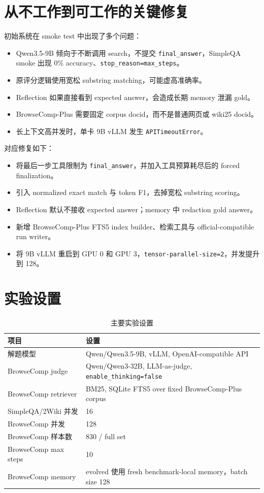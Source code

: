 \documentclass[UTF8,a4paper,11pt]{ctexart}
\begin{document}
\section{从不工作到可工作的关键修复}

初始系统在 smoke test 中出现了多个问题：

\begin{itemize}
  \item Qwen3.5-9B 倾向于不断调用 search，不提交 \texttt{final\_answer}，SimpleQA smoke 出现 0\% accuracy、\texttt{stop\_reason=max\_steps}。
  \item 原评分逻辑使用宽松 substring matching，可能虚高准确率。
  \item Reflection 如果直接看到 expected answer，会造成长期 memory 泄漏 gold。
  \item BrowseComp-Plus 需要固定 corpus docid，而不是普通网页或 wiki25 docid。
  \item 长上下文高并发时，单卡 9B vLLM 发生 \texttt{APITimeoutError}。
\end{itemize}

对应修复如下：

\begin{itemize}
  \item 将最后一步工具限制为 \texttt{final\_answer}，并加入工具预算耗尽后的 forced finalization。
  \item 引入 normalized exact match 与 token F1，去掉宽松 substring scoring。
  \item Reflection 默认不接收 expected answer；memory 中 redaction gold answer。
  \item 新增 BrowseComp-Plus FTS5 index builder、检索工具与 official-compatible run writer。
  \item 将 9B vLLM 重启到 GPU 0 和 GPU 3，\texttt{tensor-parallel-size=2}，并发提升到 128。
\end{itemize}

\section{实验设置}

\begin{table}[h]
\centering
\begin{tabular}{ll}
\toprule
项目 & 设置 \\
\midrule
解题模型 & Qwen/Qwen3.5-9B, vLLM, OpenAI-compatible API \\
BrowseComp judge & Qwen/Qwen3-32B, LLM-as-judge, \texttt{enable\_thinking=false} \\
BrowseComp retriever & BM25, SQLite FTS5 over fixed BrowseComp-Plus corpus \\
SimpleQA/2Wiki 并发 & 16 \\
BrowseComp 并发 & 128 \\
BrowseComp 样本数 & 830 / full set \\
BrowseComp max steps & 10 \\
BrowseComp memory & evolved 使用 fresh benchmark-local memory，batch size 128 \\
\bottomrule
\end{tabular}
\caption{主要实验设置}
\end{table}
\end{document}
